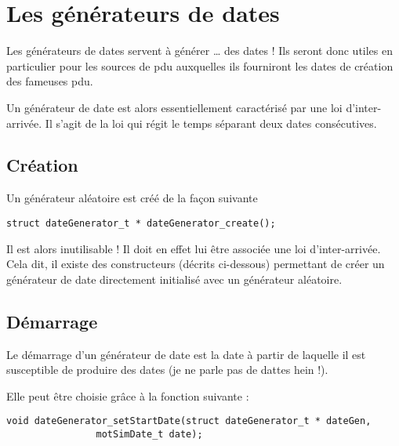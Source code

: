 %
\section{Les générateurs de dates}
\label{section:date-gen}

   Les générateurs de dates servent à générer \ldots{} des dates ! Ils
seront donc utiles en particulier pour les sources de {\sc pdu}
auxquelles ils fourniront les dates de création des fameuses {\sc
  pdu}.

   Un générateur de date est alors essentiellement caractérisé par une
loi d'inter-arrivée. Il s'agit de la loi qui régit le temps séparant
deux dates consécutives.

%
\subsection{Création}

   Un générateur aléatoire est créé de la façon suivante

\begin{verbatim}
struct dateGenerator_t * dateGenerator_create();
\end{verbatim}

   Il est alors inutilisable ! Il doit en effet lui être associée une
loi d'inter-arrivée. Cela dit, il existe des constructeurs (décrits
ci-dessous) permettant de créer un générateur de date directement
initialisé avec un générateur aléatoire.

%
\subsection{Démarrage}

   Le démarrage d'un générateur de date est la date à partir de
laquelle il est susceptible de produire des dates (je ne parle pas de
dattes hein !).

   Elle peut être choisie grâce à la fonction suivante :

\begin{verbatim}
void dateGenerator_setStartDate(struct dateGenerator_t * dateGen,
				motSimDate_t date);
\end{verbatim}

